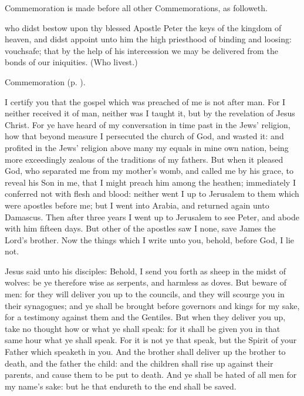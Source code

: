 \begin{rubric}
	Commemoration  is made before all other Commemorations, as followeth.
\end{rubric}

 who didst bestow upon thy blessed Apostle Peter the keys of the kingdom of heaven, and didst  appoint unto him the high priesthood of binding and loosing: vouchsafe; that by the help of his intercession we may be delivered from the bonds of our iniquities. (Who livest.)

\begin{rubric}
	Commemoration  (p. \pageref{JohnBaptistCollect}).
\end{rubric}

 I certify you that the gospel which was preached of me is not after man. For I neither received it of man, neither was I taught it, but by the revelation of Jesus Christ. For ye have heard of my conversation in time past in the Jews' religion, how that beyond measure I persecuted the church of God, and wasted it: and profited in the Jews' religion above many my equals in mine own nation, being more exceedingly zealous of the traditions of my fathers. But when it pleased God, who separated me from my mother’s womb, and called me by his grace, to reveal his Son in me, that I might preach him among the heathen; immediately I conferred not with flesh and blood: neither went I up to Jerusalem to them which were apostles before me; but I went into Arabia, and returned again unto Damascus. Then after three years I went up to Jerusalem to see Peter, and abode with him fifteen days. But other of the apostles saw I none, save James the Lord’s brother. Now the things which I write unto you, behold, before God, I lie not.


 Jesus said unto his disciples: Behold, I send you forth as sheep in the midst of wolves: be ye therefore wise as serpents, and harmless as doves. But beware of men: for they will deliver you up to the councils, and they will scourge you in their synagogues; and ye shall be brought before governors and kings for my sake, for a testimony against them and the Gentiles. But when they deliver you up, take no thought how or what ye shall speak: for it shall be given you in that same hour what ye shall speak. For it is not ye that speak, but the Spirit of your Father which speaketh in you. And the brother shall deliver up the brother to death, and the father the child: and the children shall rise up against their parents, and cause them to be put to death. And ye shall be hated of all men for my name's sake: but he that endureth to the end shall be saved. 

